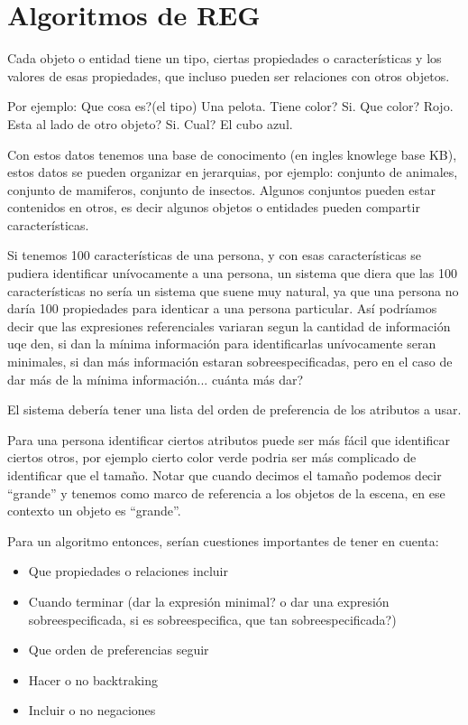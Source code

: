 \section{Algoritmos de REG}

Cada objeto o entidad tiene un tipo, ciertas propiedades o caracter\'isticas y los valores de esas propiedades, que incluso pueden ser relaciones con otros objetos. 

Por ejemplo: Que cosa es?(el tipo) Una pelota. Tiene color? Si. Que color? Rojo. Esta al lado de otro objeto? Si. Cual? El cubo azul.

Con estos datos tenemos una base de conocimento (en ingles knowlege base KB), estos datos se pueden organizar en jerarquias, por ejemplo: conjunto de animales, conjunto de mamiferos, conjunto de insectos. Algunos conjuntos pueden estar contenidos en otros, es decir algunos objetos o entidades pueden compartir caracter\'isticas.

Si tenemos 100 caracter\'isticas de una persona, y con esas caracter\'isticas se pudiera identificar un\'ivocamente a una persona, un sistema que diera que las 100 caracter\'isticas no ser\'ia un sistema que suene muy natural, ya que una persona no dar\'ia 100 propiedades para identicar a una persona particular. As\'i podr\'iamos decir que las expresiones referenciales variaran segun la cantidad de informaci\'on uqe den, si dan la m\'inima informaci\'on para identificarlas un\'ivocamente seran minimales, si dan m\'as informaci\'on estaran sobreespecificadas, pero en el caso de dar m\'as de la m\'inima informaci\'on... cu\'anta m\'as dar?

El sistema deber\'ia tener una lista del orden de preferencia de los atributos a usar. 

Para una persona identificar ciertos atributos puede ser m\'as f\'acil que identificar ciertos otros, por ejemplo cierto color verde podria ser m\'as complicado de identificar que el tama\~no. Notar que cuando decimos el tama\~no podemos decir ``grande'' y tenemos como marco de referencia a los objetos de la escena, en ese contexto un objeto es ``grande''.

Para un algoritmo entonces, ser\'ian cuestiones importantes de tener en cuenta: 

\begin{itemize}
 \item Que propiedades o relaciones incluir
 \item Cuando terminar (dar la expresi\'on minimal? o dar una expresi\'on sobreespecificada, si es sobreespecifica, que tan sobreespecificada?)
 \item Que orden de preferencias seguir
 \item Hacer o no backtraking
 \item Incluir o no negaciones
\end{itemize}



